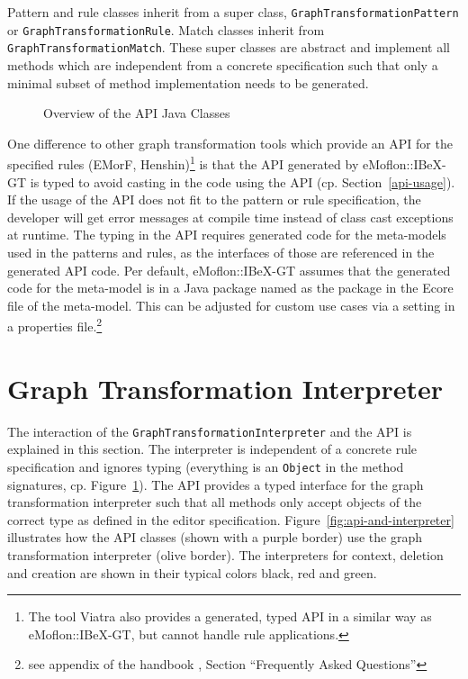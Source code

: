 \noindent
Pattern and rule classes inherit from a super class, \texttt{GraphTransformationPattern} or \texttt{GraphTransformationRule}.
Match classes inherit from \texttt{GraphTransformationMatch}.
These super classes are abstract and implement all methods which are independent from a concrete specification such that only a minimal subset of method implementation needs to be generated.

\begin{figure}[H]
	\centering
	\begin{adjustwidth}{-15mm}{}
		
	\end{adjustwidth}
	\caption{Overview of the API Java Classes}
	\label{fig:api-classes}
\end{figure}

\noindent
One difference to other graph transformation tools which provide an API for the specified rules (\eg EMorF, Henshin)\footnote{The tool Viatra \cite{VIATRAWebsite} also provides a generated, typed API in a similar way as eMoflon::IBeX-GT, but cannot handle rule applications.} is that the API generated by eMoflon::IBeX-GT is typed to avoid casting in the code using the API (cp. Section~\ref{api-usage}).
If the usage of the API does not fit to the pattern or rule specification, the developer will get error messages at compile time instead of class cast exceptions at runtime.
The typing in the API requires generated code for the meta-models used in the patterns and rules, as the interfaces of those are referenced in the generated API code.
Per default, eMoflon::IBeX-GT assumes that the generated code for the meta-model is in a Java package named as the package in the Ecore file of the meta-model.
This can be adjusted for custom use cases via a setting in a properties file.\footnote{see appendix of the handbook \cite{eMoflonIBeX-GT-Handbook}, Section ``Frequently Asked Questions''}

\section{Graph Transformation Interpreter}
\label{gt-interpreter}
The interaction of the \texttt{GraphTransformationInterpreter} and the API is explained in this section.
The interpreter is independent of a concrete rule specification and ignores typing (\ie everything is an \texttt{Object} in the method signatures, cp. Figure~\ref{fig:api-classes}).
The API provides a typed interface for the graph transformation interpreter such that all methods only accept objects of the correct type as defined in the editor specification.
Figure~\ref{fig:api-and-interpreter} illustrates how the API classes (shown with a purple border) use the graph transformation interpreter (olive border).
The interpreters for context, deletion and creation are shown in their typical colors black, red and green.

